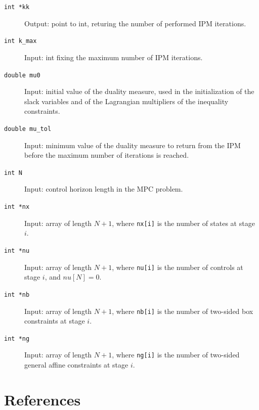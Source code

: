\documentclass[a4paper]{report}
\begin{document}
\begin{description}

\item[\tt int *kk] Output: point to int, returing the number of performed IPM iterations.

\item[\tt int k\_max] Input: int fixing the maximum number of IPM iterations.

\item[\tt double mu0] Input: initial value of the duality measure, used in the initialization of the slack variables and of the Lagrangian multipliers of the inequality constraints.

\item[\tt double mu\_tol] Input: minimum value of the duality measure to return from the IPM before the maximum number of iterations is reached.

\item[\tt int N] Input: control horizon length in the MPC problem.

\item[\tt int *nx] Input: array of length $N+1$, where {\tt nx[i]} is the number of states at stage $i$.

\item[\tt int *nu] Input: array of length $N+1$, where {\tt nu[i]} is the number of controls at stage $i$, and $nu[N]=0$.

\item[\tt int *nb] Input: array of length $N+1$, where {\tt nb[i]} is the number of two-sided box constraints at stage $i$.

\item[\tt int *ng] Input: array of length $N+1$, where {\tt ng[i]} is the number of two-sided general affine constraints at stage $i$.

\end{description}




\chapter{References}
\end{document}
